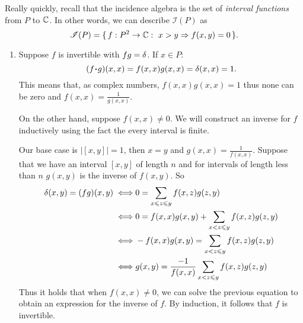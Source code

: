 \documentclass[12pt]{memoir}
\begin{document}
Really quickly, recall that the incidence algebra is the set of \emph{interval functions} from $P$ to $\mathbb{C}$. In other words, we can describe $\mathscr{I}(P)$ as 
$$\mathscr{I}(P)=\set{f:P^2\to\bC:\ x>y\To f(x,y)=0}.$$
\begin{ptcbr}
    \begin{enumerate}
        \itemsep=-0.4em
        \item Suppose $f$ is invertible with $fg=\delta$. If $x\in P$:
        $$(f\.g)(x,x)=f(x,x)g(x,x)=\dl(x,x)=1.$$
        This means that, as complex numbers, $f(x,x)g(x,x)=1$ thus none can be zero and $f(x,x)=\frac{1}{g(x,x)}$.\par 
        On the other hand, suppose $f(x,x)\neq 0$. We will construct an inverse for $f$ inductively using the fact the every interval is finite.\par
        Our base case is $|[x,y]|=1$, then $x=y$ and $g(x,x)=\frac{1}{f(x,x)}$. Suppose that we have an interval $[x,y]$ of length $n$ and for intervals of length less than $n$ $g(x,y)$ is the inverse of $f(x,y)$. So 
        \begin{align*}
            \delta(x,y)=(fg)(x,y)\iff &0=\sum_{x\leqslant z\leqslant y}f(x,z)g(z,y)\\
            \iff &0=f(x,x)g(x,y)+\sum_{x< z\leqslant y}f(x,z)g(z,y)\\
            \iff &-f(x,x)g(x,y)=\sum_{x< z\leqslant y}f(x,z)g(z,y)\\
            \iff &g(x,y)=\frac{-1}{f(x,x)}\sum_{x< z\leqslant y}f(x,z)g(z,y)\\
        \end{align*}
        Thus it holds that when $f(x,x)\neq 0$, we can solve the previous equation to obtain an expression for the inverse of $f$. By induction, it follows that $f$ is invertible. 
    \end{enumerate}
\end{ptcbr}
\end{document}
